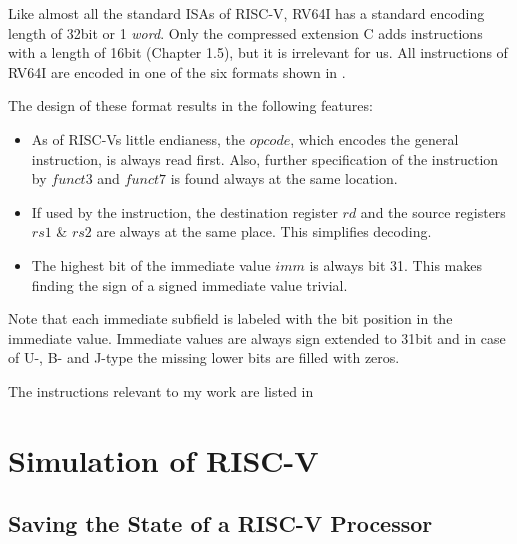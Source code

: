 Like almost all the standard ISAs of RISC-V, RV64I has a standard encoding
length of 32bit or 1 \emph{word}. Only the compressed extension C adds
instructions with a length of 16bit \cite{riscv-isa}(Chapter 1.5), but it is
irrelevant for us. All instructions of RV64I are encoded in one of the six
formats shown in .



The design of these format results in the following features:
\begin{itemize}
    \item As of RISC-Vs little endianess, the $opcode$, which encodes the general
          instruction, is always read first. Also, further specification of the
          instruction by $funct3$ and $funct7$ is found always at the same location.
    \item If used by the instruction, the destination register $rd$ and the source
          registers $rs1$ \& $rs2$ are always at the same place. This simplifies
          decoding.
    \item The highest bit of the immediate value $imm$ is always bit 31. This makes
          finding the sign of a signed immediate value trivial.
\end{itemize}
Note that each immediate subfield is labeled with the bit position in the immediate value.
Immediate values are always sign extended to 31bit and in case of U-, B- and J-type the missing lower bits are filled with zeros.

The instructions relevant to my work are listed in

\section{Simulation of RISC-V}

\subsection{Saving the State of a RISC-V Processor}\label{statefile}